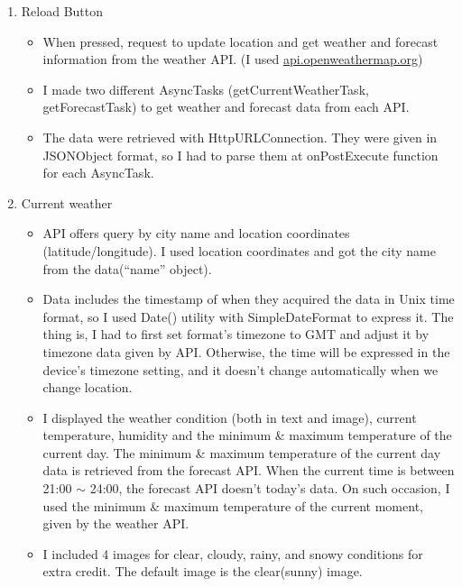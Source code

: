 \documentclass[11pt,a4paper]{article}
\begin{document}
	\begin{enumerate}
		\item Reload Button
		\begin{itemize}
			\item When pressed, request to update location and get weather and forecast information from the weather API. (I used \href{http://api.openweathermap.org}{api.openweathermap.org})
			
			\item I made two different AsyncTasks (getCurrentWeatherTask, getForecastTask) to get weather and forecast data from each API.
			
			\item The data were retrieved with HttpURLConnection. They were given in JSONObject format, so I had to parse them at onPostExecute function for each AsyncTask.
			
		\end{itemize} 
	
		\item Current weather
		\begin{itemize}
			\item API offers query by city name and location coordinates (latitude/longitude). I used location coordinates and got the city name from the data(“name” object).
			
			\item Data includes the timestamp of when they acquired the data in Unix time format, so I used Date() utility with SimpleDateFormat to express it. The thing is, I had to first set format’s timezone to GMT and adjust it by timezone data given by API. Otherwise, the time will be expressed in the device’s timezone setting, and it doesn’t change automatically when we change location.
			
			\item I displayed the weather condition (both in text and image), current temperature, humidity and the minimum \& maximum temperature of the current day. The minimum \& maximum temperature of the current day data is retrieved from the forecast API. When the current time is between 21:00 $\sim$ 24:00, the forecast API doesn’t today’s data. On such occasion, I used the minimum \& maximum temperature of the current moment, given by the weather API.
			
			\item I included 4 images for clear, cloudy, rainy, and snowy conditions for extra credit. The default image is the clear(sunny) image.
		\end{itemize} 
	

\end{enumerate}
\end{document}
